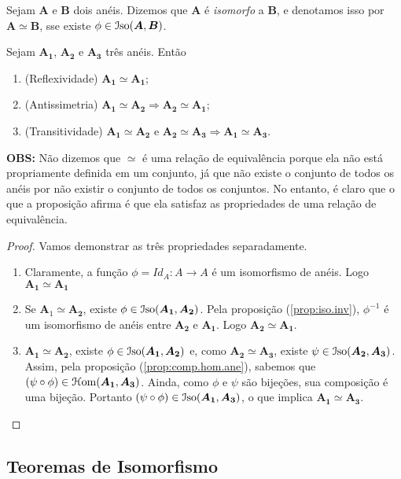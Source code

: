 \begin{defi}
	Sejam $\bm A$ e $\bm B$ dois anéis. Dizemos que $\bm A$ é \emph{isomorfo} a $\bm B$, e denotamos isso por $\bm A \simeq \bm B$, sse existe $\phi \in \mathcal{I}\mathrm{so}(\bm A,\bm B)$.
\end{defi}	

\begin{prop}
	Sejam $\bm{A_1}$, $\bm{A_2}$ e $\bm{A_3}$ três anéis. Então
	\begin{enumerate}
	\item (Reflexividade) $\bm{A_1} \simeq \bm{A_1}$;
	\item (Antissimetria) $\bm{A_1} \simeq \bm{A_2} \Rightarrow \bm{A_2} \simeq \bm{A_1}$;
	\item (Transitividade) $\bm{A_1} \simeq \bm{A_2} \text{\ e\ } \bm{A_2} \simeq \bm{A_3} \Rightarrow \bm{A_1} \simeq \bm{A_3}$.
	\end{enumerate}
\textbf{OBS:} Não dizemos que $\simeq$ é uma relação de equivalência porque ela não está propriamente definida em um conjunto, já que não existe o conjunto de todos os anéis por não existir o conjunto de todos os conjuntos. No entanto, é claro que o que a proposição afirma é que ela satisfaz as propriedades de uma relação de equivalência.
\end{prop}
\begin{proof}
	Vamos demonstrar as três propriedades separadamente.
	\begin{enumerate}
	\item Claramente, a função $\phi=Id_A: A \to A$ é um isomorfismo de anéis. Logo $\bm{A_1} \simeq \bm{A_1}$
	\item Se $\textbf{A}_1 \simeq \bm{A_2}$, existe $\phi \in \mathcal{I}\mathrm{so}(\bm{A_1},\bm{A_2})$. Pela proposição (\ref{prop:iso.inv}), $\phi^{-1}$ é um isomorfismo de anéis entre $\bm{A_2}$ e $\bm{A_1}$. Logo $\bm{A_2} \simeq \bm{A_1}$.
	\item $\bm{A_1} \simeq \bm{A_2}$, existe $\phi \in \mathcal{I}\mathrm{so}(\bm{A_1},\bm{A_2})$ e, como $\bm{A_2} \simeq \bm{A_3}$, existe $\psi \in \mathcal{I}\mathrm{so}(\bm{A_2},\bm{A_3})$. Assim, pela proposição (\ref{prop:comp.hom.ane}), sabemos que $(\psi \circ \phi) \in \mathcal{H}\mathrm{om}(\bm{A_1},\bm{A_3})$. Ainda, como $\phi$ e $\psi$ são bijeções, sua composição é uma bijeção. Portanto $(\psi \circ \phi) \in \mathcal{I}\mathrm{so}(\bm{A_1},\bm{A_3})$, o que implica $\bm{A_1} \simeq \bm{A_3}$.
	\end{enumerate}
\end{proof}

\subsection{Teoremas de Isomorfismo}


